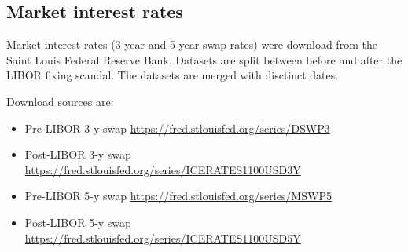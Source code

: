 \documentclass[11pt,]{report}
\newenvironment{Shaded}{\begin{snugshade}}{\end{snugshade}}
\newcommand{\CommentTok}[1]{\textcolor[rgb]{0.56,0.35,0.01}{\textit{#1}}}
\newcommand{\DataTypeTok}[1]{\textcolor[rgb]{0.13,0.29,0.53}{#1}}
\newcommand{\DecValTok}[1]{\textcolor[rgb]{0.00,0.00,0.81}{#1}}
\newcommand{\KeywordTok}[1]{\textcolor[rgb]{0.13,0.29,0.53}{\textbf{#1}}}
\newcommand{\NormalTok}[1]{#1}
\newcommand{\OperatorTok}[1]{\textcolor[rgb]{0.81,0.36,0.00}{\textbf{#1}}}
\newcommand{\StringTok}[1]{\textcolor[rgb]{0.31,0.60,0.02}{#1}}
\begin{document}
\begin{Shaded}
\end{Shaded}

\hypertarget{market-interest-rates}{%
\subsection{Market interest rates}\label{market-interest-rates}}

Market interest rates (3-year and 5-year swap rates) were download from the Saint Louis Federal Reserve Bank. Datasets are split between before and after the LIBOR fixing scandal. The datasets are merged with disctinct dates.

Download sources are:

\begin{itemize}
\item
  Pre-LIBOR 3-y swap \url{https://fred.stlouisfed.org/series/DSWP3}
\item
  Post-LIBOR 3-y swap \url{https://fred.stlouisfed.org/series/ICERATES1100USD3Y}
\item
  Pre-LIBOR 5-y swap \url{https://fred.stlouisfed.org/series/MSWP5}
\item
  Post-LIBOR 5-y swap \url{https://fred.stlouisfed.org/series/ICERATES1100USD5Y}
\end{itemize}
\end{document}
